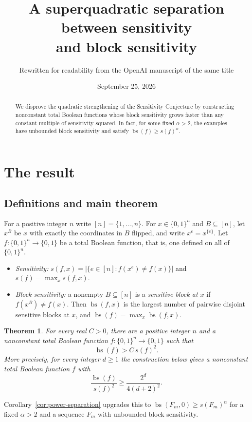 \documentclass[11pt]{article}
\title{A superquadratic separation between sensitivity\\and block sensitivity}
\author{Rewritten for readability from the OpenAI manuscript of the same title}
\date{September 25, 2026}
\newcommand{\bs}{\operatorname{bs}}
\newtheorem{theorem}{Theorem}[section]
\theoremstyle{definition}
\theoremstyle{remark}
\begin{document}
\maketitle
\begin{abstract}
We disprove the quadratic strengthening of the Sensitivity Conjecture by
constructing nonconstant total Boolean functions whose block sensitivity grows
faster than any constant multiple of sensitivity squared. In fact, for some
fixed \(\alpha>2\), the examples have unbounded block sensitivity and satisfy
\(\bs(f)\ge s(f)^\alpha\).
\end{abstract}

\section{The result}
\label{sec:introduction}

\subsection{Definitions and main theorem}

For a positive integer $n$ write $[n]=\{1,\ldots,n\}$. For
$x\in\{0,1\}^n$ and $B\subseteq[n]$, let $x^B$ be $x$ with exactly the
coordinates in $B$ flipped, and write $x^e=x^{\{e\}}$. Let
$f:\{0,1\}^n\to\{0,1\}$ be a total Boolean function, that is, one defined on
all of $\{0,1\}^n$.
\begin{itemize}[nosep]
\item \emph{Sensitivity:}
$s(f,x)=\bigl|\{e\in[n]:f(x^e)\ne f(x)\}\bigr|$ and $s(f)=\max_x s(f,x)$.
\item \emph{Block sensitivity:} a nonempty $B\subseteq[n]$ is a
\emph{sensitive block at $x$} if $f(x^B)\ne f(x)$. Then $\bs(f,x)$ is the
largest number of pairwise disjoint sensitive blocks at $x$, and
$\bs(f)=\max_x\bs(f,x)$.
\end{itemize}

\begin{theorem}\label{thm:main}
For every real \(C>0\), there are a positive integer \(n\) and a
nonconstant total Boolean function \(f:\{0,1\}^n\to\{0,1\}\) such that
\[
 \bs(f)>C\,s(f)^2.
\]
More precisely, for every integer \(d\ge1\) the construction below gives
a nonconstant total Boolean function \(f\) with
\[
 \frac{\bs(f)}{s(f)^2}\ge \frac{2^d}{4(d+2)^2}.
\]
\end{theorem}

Corollary~\ref{cor:power-separation} upgrades this to
$\bs(F_m,0)\ge s(F_m)^\alpha$ for a fixed $\alpha>2$ and a sequence $F_m$
with unbounded block sensitivity.
\end{document}
